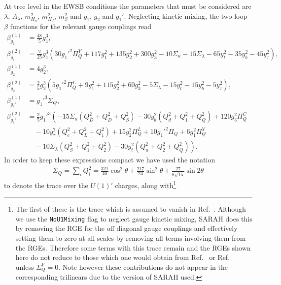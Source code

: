 \documentclass[preprint,amsmath,amssymb,aps,superscriptaddress,prd,
showpacs,floatfix,nofootinbib]{revtex4-1}
\begin{document}
At tree level in the EWSB conditions the parameters that must be considered
are $\lambda$, $A_\lambda$, $m_{H_u}^2$, $m_{H_d}^2$, $m_S^2$ and $g_1$, $g_2$
and $g_1'$.  Neglecting kinetic mixing, the two-loop $\beta$ functions for
the relevant gauge couplings read
\begin{subequations} \label{eq:USSMGaugeBetas}
\begin{align}
\beta_{g_1}^{(1)} &= \frac{48}{5} g_1^3 , \label{eq:USSMg1BetaOneLoop} \\
\beta_{g_1}^{(2)} &= \frac{2}{25} g_1^3 \left ( 30 g_1'^2 \Pi_{Q}^Y +
117 g_1^2 + 135 g_2^2 + 300 g_3^2 - 10 \Sigma_{\kappa } - 15 \Sigma_{\lambda }
- 65 y_t^2 - 35 y_b^2 - 45 y_{\tau }^2 \right ) , \label{eq:USSMg1BetaTwoLoop}\\
\beta_{g_2}^{(1)} &= 4 g_2^3 , \label{eq:USSMg2BetaOneLoop} \\
\beta_{g_2}^{(2)} &= \frac{2}{5} g_2^3 \left ( 5 g_1'^2 \Pi _{Q}^L + 9 g_1^2
+ 115 g_2^2 + 60 g_3^2 - 5 \Sigma_{\lambda } - 15 y_t^2 - 15 y_b^2 -
5 y_{\tau }^2 \right) , \label{eq:USSMg2BetaTwoLoop} \\
\beta_{g_1'}^{(1)} &= g_1'^3 \Sigma_{Q} , \label{eq:USSMg1pBetaOneLoop} \\
\beta_{g_1'}^{(2)} &= \frac{2}{5} g_1'^3 \left ( -15 \Sigma_{\kappa } \left (
Q_{\bar{D}}^2 + Q_D^2 + Q_S^2 \right ) - 30 y_b^2 \left ( Q_d^2 + Q_1^2 +
Q_Q^2 \right ) + 120 g_3^2 \Pi_{Q}^C \right . \nonumber \\
& \quad {} - 10 y_{\tau }^2 \left ( Q_e^2 + Q_L^2 + Q_1^2 \right ) +
15 g_2^2 \Pi_{Q}^L + 10 g_1'^2 \Pi_{Q} + 6 g_1^2 \Pi_{Q}^Y \nonumber \\
& \quad \left . {} - 10 \Sigma_{\lambda } \left ( Q_S^2 + Q_1^2 + Q_2^2
\right ) - 30 y_t^2 \left ( Q_u^2 + Q_2^2 + Q_Q^2 \right ) \right ) .
\label{eq:USSMg1pBetaTwoLoop}
\end{align}
\end{subequations}
In order to keep these expressions compact we have used the notation
\begin{align*}
\Sigma_{Q} = \sum_i Q_i^2 = \frac{321}{40} \cos^2\theta +
\frac{217}{24} \sin^2\theta + \frac{27}{8 \sqrt{15}} \sin 2\theta
\end{align*}
to denote the trace over the $U(1)'$ charges, along
with\footnote{The first of these is the trace which is assumed to vanish in
Ref.~\cite{Martin:1993zk}.  Although we use the \texttt{NoU1Mixing} flag to
neglect gauge kinetic mixing, SARAH does this by removing the RGE for
the off diagonal gauge couplings and effectively setting them to
zero at all scales by removing all terms involving them from the
RGEs.  Therefore some terms with this trace remain and the RGEs shown here
do not reduce to those which one would obtain from
Ref.~\cite{Martin:1993zk} or Ref.~\cite{Athron:2009bs} unless
$\Sigma_{Q}^Y = 0$.  Note however these contributions do not appear in the
corresponding trilinears due to the version of SARAH used.}
\end{document}
